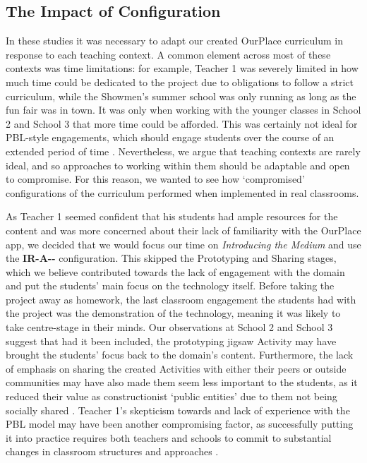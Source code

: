 \documentclass[,hyphens]{sigchi}
\begin{document}
\subsection{The Impact of Configuration}
In these studies it was necessary to adapt our created OurPlace curriculum in response to each teaching context. A common element across most of these contexts was time limitations: for example, Teacher 1 was severely limited in how much time could be dedicated to the project due to obligations to follow a strict curriculum, while the Showmen's summer school was only running as long as the fun fair was in town. It was only when working with the younger classes in School 2 and School 3 that more time could be afforded. This was certainly not ideal for PBL-style engagements, which should engage students over the course of an extended period of time \cite{Blumenfeld1991}. Nevertheless, we argue that teaching contexts are rarely ideal, and so approaches to working within them should be adaptable and open to compromise. For this reason, we wanted to see how `compromised' configurations of the curriculum performed when implemented in real classrooms. 

As Teacher 1 seemed confident that his students had ample resources for the content and was more concerned about their lack of familiarity with the OurPlace app, we decided that we would focus our time on \textit{Introducing the Medium} and use the \textbf{IR-A-\--} configuration. This skipped the Prototyping and Sharing stages, which we believe contributed towards the lack of engagement with the domain and put the students' main focus on the technology itself. Before taking the project away as homework, the last classroom engagement the students had with the project was the demonstration of the technology, meaning it was likely to take centre-stage in their minds. Our observations at School 2 and School 3 suggest that had it been included, the prototyping jigsaw Activity may have brought the students' focus back to the domain's content. Furthermore, the lack of emphasis on sharing the created Activities with either their peers or outside communities may have also made them seem less important to the students, as it reduced their value as constructionist `public entities' due to them not being socially shared \cite{PapertSeymourandHarel1991a}. Teacher 1's skepticism towards and lack of experience with the PBL model may have been another compromising factor, as successfully putting it into practice requires both teachers and schools to commit to substantial changes in classroom structures and approaches \cite{InnovationUnit2016}.
\end{document}
